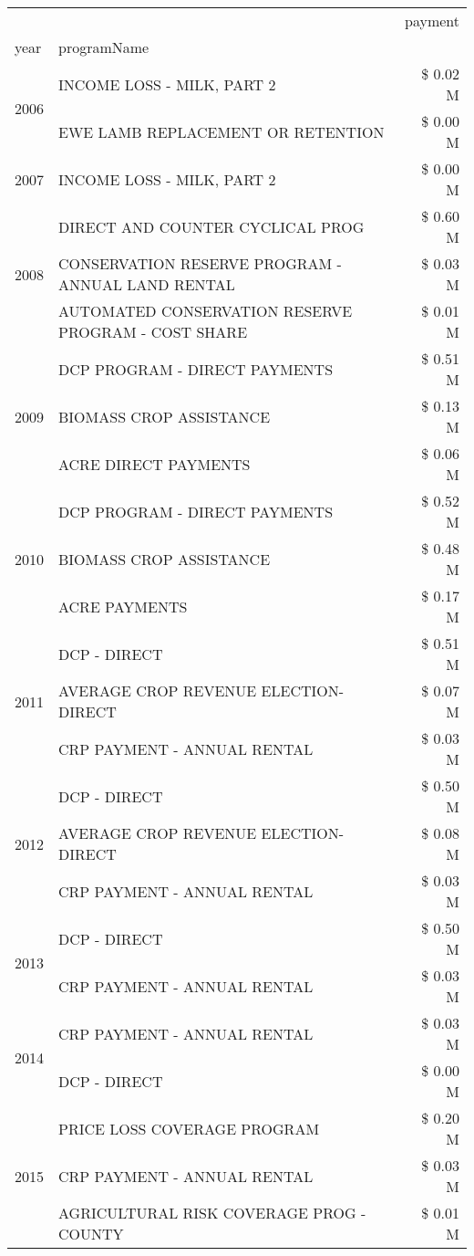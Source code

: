 \begin{tabular}{llr}
\toprule
 &  & payment \\
year & programName &  \\
\midrule
\multirow[t]{2}{*}{2006} & INCOME LOSS - MILK, PART 2 & \$ 0.02 M \\
 & EWE LAMB REPLACEMENT OR RETENTION & \$ 0.00 M \\
\cline{1-3}
2007 & INCOME LOSS - MILK, PART 2 & \$ 0.00 M \\
\cline{1-3}
\multirow[t]{3}{*}{2008} & DIRECT AND COUNTER CYCLICAL PROG & \$ 0.60 M \\
 & CONSERVATION RESERVE PROGRAM - ANNUAL LAND RENTAL & \$ 0.03 M \\
 & AUTOMATED CONSERVATION RESERVE PROGRAM - COST SHARE & \$ 0.01 M \\
\cline{1-3}
\multirow[t]{3}{*}{2009} & DCP PROGRAM - DIRECT PAYMENTS & \$ 0.51 M \\
 & BIOMASS CROP ASSISTANCE & \$ 0.13 M \\
 & ACRE DIRECT PAYMENTS & \$ 0.06 M \\
\cline{1-3}
\multirow[t]{3}{*}{2010} & DCP PROGRAM - DIRECT PAYMENTS & \$ 0.52 M \\
 & BIOMASS CROP ASSISTANCE & \$ 0.48 M \\
 & ACRE PAYMENTS & \$ 0.17 M \\
\cline{1-3}
\multirow[t]{3}{*}{2011} & DCP - DIRECT & \$ 0.51 M \\
 & AVERAGE CROP REVENUE ELECTION-DIRECT & \$ 0.07 M \\
 & CRP PAYMENT - ANNUAL RENTAL & \$ 0.03 M \\
\cline{1-3}
\multirow[t]{3}{*}{2012} & DCP - DIRECT & \$ 0.50 M \\
 & AVERAGE CROP REVENUE ELECTION-DIRECT & \$ 0.08 M \\
 & CRP PAYMENT - ANNUAL RENTAL & \$ 0.03 M \\
\cline{1-3}
\multirow[t]{2}{*}{2013} & DCP - DIRECT & \$ 0.50 M \\
 & CRP PAYMENT - ANNUAL RENTAL & \$ 0.03 M \\
\cline{1-3}
\multirow[t]{2}{*}{2014} & CRP PAYMENT - ANNUAL RENTAL & \$ 0.03 M \\
 & DCP - DIRECT & \$ 0.00 M \\
\cline{1-3}
\multirow[t]{3}{*}{2015} & PRICE LOSS COVERAGE PROGRAM & \$ 0.20 M \\
 & CRP PAYMENT - ANNUAL RENTAL & \$ 0.03 M \\
 & AGRICULTURAL RISK COVERAGE PROG - COUNTY & \$ 0.01 M \\

\end{tabular}
